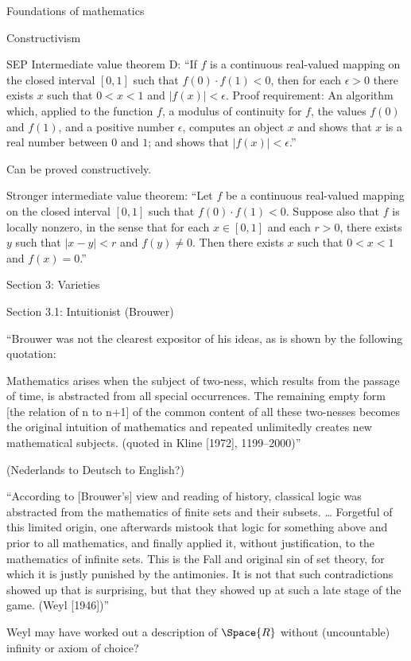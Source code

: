 \begin{plSection}{Foundations of mathematics}
\begin{plSection}{Constructivism}
\begin{plSection}{SEP}
Intermediate value theorem D:
``If $f$ is a continuous real-valued mapping 
on the closed interval $[0,1]$ 
such that $f(0)⋅f(1)<0$, 
then for each $\epsilon>0$ 
there exists $x$ such that $0<x<1$ and $|f(x)|<\epsilon$.
Proof requirement: 
An algorithm which, applied to the function $f$, 
a modulus of continuity for $f$, the values $f(0)$ and $f(1)$, 
and a positive number $\epsilon$,
computes an object $x$ 
and shows that $x$ is a real number between $0$ and $1$; and
shows that $|f(x)|<\epsilon$.''~\cite{sep:ConstructiveMathematics}

Can be proved constructively.

Stronger intermediate value theorem:
``Let $f$ be a continuous real-valued mapping 
on the closed interval $[0,1]$ 
such that $f(0)⋅f(1)<0$. 
Suppose also that $f$ is locally nonzero, 
in the sense that for each $x \in [0,1]$
and each $r>0$, 
there exists $y$ such that $|x−y|<r$ and $f(y) \neq 0$. 
Then there exists $x$ such that $0<x<1$ and $f(x)=0$.''

Section 3: Varieties

Section 3.1: Intuitionist (Brouwer)

``Brouwer was not the clearest expositor of his ideas, 
as is shown by the following quotation:

Mathematics arises when the subject of two-ness, 
which results from the passage of time, 
is abstracted from all special occurrences. 
The remaining empty form [the relation of n to n+1] 
of the common content of all these two-nesses 
becomes the original intuition of mathematics 
and repeated unlimitedly creates new mathematical subjects. 
(quoted in Kline [1972], 1199–2000)''

(Nederlands to Deutsch to English?)

``According to [Brouwer’s] view and reading of history, 
classical logic was abstracted 
from the mathematics of finite sets and their subsets. \ldots 
Forgetful of this limited origin, 
one afterwards mistook that logic 
for something above and prior to all mathematics, 
and finally applied it, without justification, 
to the mathematics of infinite sets. 
This is the Fall and original sin of set theory, 
for which it is justly punished by the antimonies. 
It is not that such contradictions showed up that is surprising,
 but that they showed up at such a late stage of the game. 
 (Weyl [1946])''
 
Weyl may have worked out a description of
$\Space{R}$ without (uncountable) infinity or
axiom of choice?


\end{plSection}
\end{plSection}
\end{plSection}
